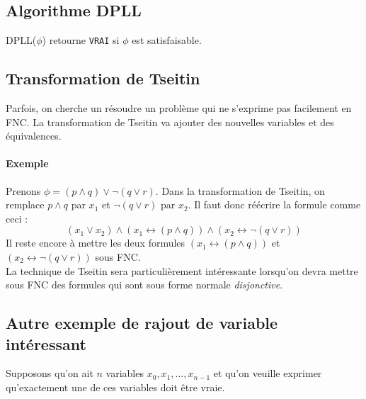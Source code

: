 \documentclass[a4paper]{article}
\begin{document}
  \subsection{Algorithme DPLL}
  DPLL($\phi$) retourne \texttt{VRAI} si $\phi$ est satisfaisable.

  \begin{algorithm}[H]
  \end{algorithm}

  \subsection{Transformation de Tseitin}
  Parfois, on cherche un résoudre un problème qui ne s'exprime pas facilement en FNC.
  La transformation de Tseitin va ajouter des nouvelles variables et des équivalences.

    \paragraph{Exemple} Prenons $ \phi = (p \land q) \lor \lnot (q \lor r) $. Dans 
    la transformation de Tseitin, on remplace $p \land q$ par $x_1$ et $\lnot (q \lor r)$ par $x_2$.
    Il faut donc réécrire la formule comme ceci :
    $$ (x_1 \lor x_2) \land (x_1 \leftrightarrow (p \land q)) \land (x_2 \leftrightarrow \lnot (q \lor r) )$$
    Il reste encore à mettre les deux formules $(x_1 \leftrightarrow (p \land q))$ et $(x_2 \leftrightarrow \lnot (q \lor r))$ sous FNC.\\

  La technique de Tseitin sera particulièrement intéressante lorsqu'on devra mettre
  sous FNC des formules qui sont sous forme normale \textit{disjonctive}.

  \subsection{Autre exemple de rajout de variable intéressant}
  Supposons qu'on ait $n$ variables $x_0, x_1, ..., x_{n-1}$ et qu'on veuille
  exprimer qu'exactement une de ces variables doit être vraie. 
\end{document}
